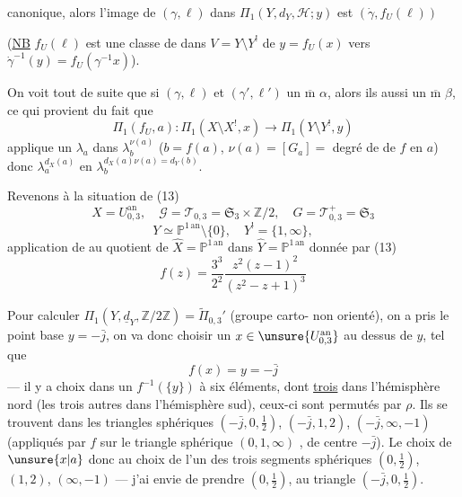 

canonique, alors l'image \inserted{$\beta$} de
$(\gamma,\ell)$ 
dans $\Pi_1(Y,d_Y,\mathcal H;y)$ est $(\dot\gamma,f_U(\ell))$

(\uline{NB} $f_U(\ell)$ est une classe de  dans
$V=Y\setminus Y^!$ de $y=f_U(x)$ vers
$\dot\gamma^{-1}(y)=f_U(\gamma^{-1}x)$).

 On voit tout de suite que si
$(\gamma,\ell)$ et $(\gamma',\ell')$  un
$\overline{\mathrm m}$ $\alpha$, alors ils  aussi
un $\overline{\mathrm m}$ $\beta$, ce qui provient du fait que
\[
\Pi_1(f_U,a):\Pi_1(X\setminus X^!,x)
\longrightarrow\Pi_1(Y\setminus Y^!,y)
\]
applique un $\lambda_a$ dans  $\lambda_b^{\nu(a)}$
($b=f(a)$, $\nu(a)=[G_a]=$ degré de 
de $f$ en $a$) donc $\lambda_a^{d_X(a)}$ en
$\lambda_b^{d_X(a)\nu(a)=d_Y(b)}$.

Revenons à la situation de (13)
\[
X=U_{0,3}^{\mathrm{an}},\quad
\mathcal G=\mathcal T_{0,3}
=\mathfrak S_3\times\mathbb Z/2,\quad
G=\mathcal T_{0,3}^{+}
=\mathfrak S_3
\]
\[
Y\simeq\mathbb P^{1\,\mathrm{an}}\setminus\{0\},\quad
Y^!=\{1,\infty\},
\]
application de  au quotient de
$\widehat X=\mathbb P^{1\,\mathrm{an}}$ dans
$\widehat Y=\mathbb P^{1\,\mathrm{an}}$ donnée par (13)
\[
f(z)=\frac{3^3}{2^2}\frac{z^2(z-1)^2}{(z^2-z+1)^3}
\]


Pour calculer
$\Pi_1(Y,\underline{d}_Y,\mathbb Z/2\mathbb Z)
=\widetilde\Pi_{0,3}'$
(groupe carto-  non orienté),
on a pris le point base $y=-\bar j$, on va donc choisir
un $x\in\unsure{U_{0,3}^{\mathrm{an}}}$ au dessus de $y$, tel que
\[
f(x)=y=-\bar j
\]
--- il y a  
choix dans un  $f^{-1}(\{y\})$ à six
éléments, dont \uline{trois} dans l'hémisphère nord
(les trois autres dans l'hémisphère sud),
ceux-ci sont permutés  par $\rho$.
Ils se trouvent  dans les
triangles sphériques $(-\bar j,0,\frac12)$, $(-\bar j,1,2)$,
$(-\bar j,\infty,-1)$ (appliqués par $f$
 sur le triangle sphérique $(0,1,\infty)$
, 
de centre $-\bar j$).
Le choix de $\unsure{x|a}$  donc
au choix de l'un des trois
segments sphériques $(0,\frac12)$, $(1,2)$, $(\infty,-1)$
--- j'ai envie de prendre $(0,\frac12)$, 
au triangle $(-\bar j,0,\frac12)$.

